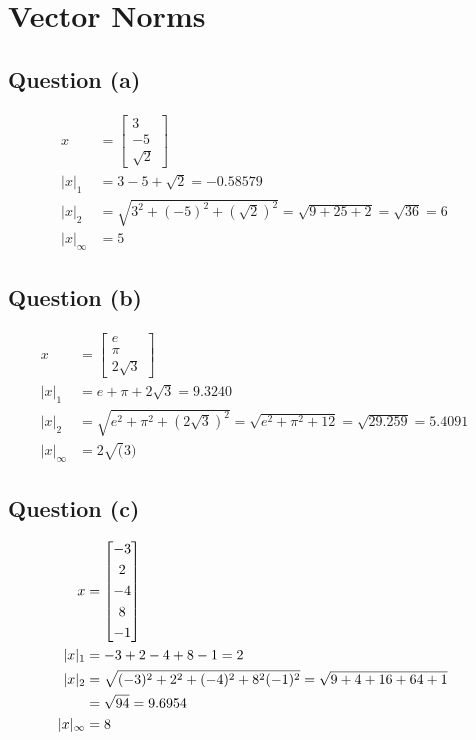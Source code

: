 \section{Vector Norms}

	\subsection{Question (a)}

	\begin{align}
		x &= \begin{bmatrix}
			3 \\[0.3em]
			-5 \\[0.3em]
			\sqrt{2}
		\end{bmatrix}& \\
		|x|_{1} &= 3 - 5 + \sqrt{2} = -0.58579& \\
		|x|_{2} &= \sqrt{3^{2} + (-5)^{2} + (\sqrt{2})^{2}} = \sqrt{9 + 25 + 2} = \sqrt{36} = 6& \\
		|x|_{\infty} &= 5&
	\label{eq:64a}
	\end{align}

	\subsection{Question (b)}

	\begin{align}
		x &= \begin{bmatrix}
			e \\[0.3em]
			\pi \\[0.3em]
			2\sqrt{3}
		\end{bmatrix}& \\
		|x|_{1} &= e + \pi + 2\sqrt{3} = 9.3240& \\
		|x|_{2} &= \sqrt{e^{2} + \pi^{2} + (2\sqrt{3})^{2}} = \sqrt{e^{2} + \pi^{2} + 12} = \sqrt{29.259} = 5.4091& \\
		|x|_{\infty} &= 2\sqrt(3)&
	\label{eq:64b}
	\end{align}

	\subsection{Question (c)}

	\begin{align}
		x &= \begin{bmatrix}
			-3 \\[0.3em]
			2 \\[0.3em]
			-4 \\[0.3em]
			8 \\[0.3em]
			-1
		\end{bmatrix}& \\
		|x|_{1} &= -3 + 2 -4 +8 -1 = 2& \\
		|x|_{2} &= \sqrt{(-3)^{2} + 2^{2} + (-4)^{2} + 8^{2} (-1)^{2}} = \sqrt{9 + 4 + 16 + 64 + 1}& \notag \\
		&= \sqrt{94} = 9.6954& \\
		|x|_{\infty} &= 8&
	\label{eq:64c}
	\end{align}